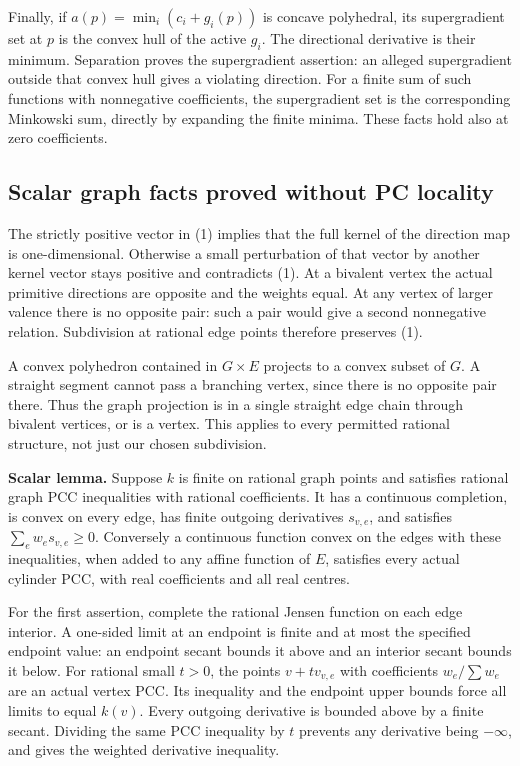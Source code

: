 \documentclass[
  11pt,
]{article}
\begin{document}
Finally, if \(a(p)=\min_i(c_i+g_i(p))\) is concave polyhedral, its
supergradient set at \(p\) is the convex hull of the active \(g_i\). The
directional derivative is their minimum. Separation proves the
supergradient assertion: an alleged supergradient outside that convex
hull gives a violating direction. For a finite sum of such functions
with nonnegative coefficients, the supergradient set is the
corresponding Minkowski sum, directly by expanding the finite minima.
These facts hold also at zero coefficients.

\subsection{Scalar graph facts proved without PC
locality}\label{scalar-graph-facts-proved-without-pc-locality}

The strictly positive vector in (1) implies that the full kernel of the
direction map is one-dimensional. Otherwise a small perturbation of that
vector by another kernel vector stays positive and contradicts (1). At a
bivalent vertex the actual primitive directions are opposite and the
weights equal. At any vertex of larger valence there is no opposite
pair: such a pair would give a second nonnegative relation. Subdivision
at rational edge points therefore preserves (1).

A convex polyhedron contained in \(G\times E\) projects to a convex
subset of \(G\). A straight segment cannot pass a branching vertex,
since there is no opposite pair there. Thus the graph projection is in a
single straight edge chain through bivalent vertices, or is a vertex.
This applies to every permitted rational structure, not just our chosen
subdivision.

\textbf{Scalar lemma.} Suppose \(k\) is finite on rational graph points
and satisfies rational graph PCC inequalities with rational
coefficients. It has a continuous completion, is convex on every edge,
has finite outgoing derivatives \(s_{v,e}\), and satisfies
\(\sum_e w_es_{v,e}\geq0\). Conversely a continuous function convex on
the edges with these inequalities, when added to any affine function of
\(E\), satisfies every actual cylinder PCC, with real coefficients and
all real centres.

For the first assertion, complete the rational Jensen function on each
edge interior. A one-sided limit at an endpoint is finite and at most
the specified endpoint value: an endpoint secant bounds it above and an
interior secant bounds it below. For rational small \(t>0\), the points
\(v+t v_{v,e}\) with coefficients \(w_e/\sum w_e\) are an actual vertex
PCC. Its inequality and the endpoint upper bounds force all limits to
equal \(k(v)\). Every outgoing derivative is bounded above by a finite
secant. Dividing the same PCC inequality by \(t\) prevents any
derivative being \(-\infty\), and gives the weighted derivative
inequality.
\end{document}
